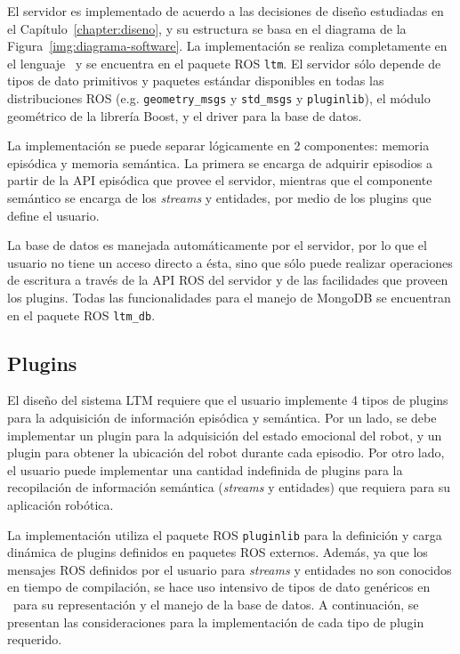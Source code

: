 El servidor es implementado de acuerdo a las decisiones de diseño estudiadas en el Capítulo~\ref{chapter:diseno}, y su estructura se basa en el diagrama de la Figura~\ref{img:diagrama-software}. La implementación se realiza completamente en el lenguaje \CC \ y se encuentra en el paquete ROS \texttt{ltm}. El servidor sólo depende de tipos de dato primitivos y paquetes estándar disponibles en todas las distribuciones ROS (e.g. \texttt{geometry\_msgs} y \texttt{std\_msgs} y \texttt{pluginlib}), el módulo geométrico de la librería Boost, y el driver para la base de datos. 

La implementación se puede separar lógicamente en 2 componentes: memoria episódica y memoria semántica. La primera se encarga de adquirir episodios a partir de la API episódica que provee el servidor, mientras que el componente semántico se encarga de los \textit{streams} y entidades, por medio de los plugins que define el usuario.

La base de datos es manejada automáticamente por el servidor, por lo que el usuario no tiene un acceso directo a ésta, sino que sólo puede realizar operaciones de escritura a través de la API ROS del servidor y de las facilidades que proveen los plugins. Todas las funcionalidades para el manejo de MongoDB se encuentran en el paquete ROS \texttt{ltm\_db}.


\subsection{Plugins}

El diseño del sistema LTM requiere que el usuario implemente 4 tipos de plugins para la adquisición de información episódica y semántica. Por un lado, se debe implementar un plugin para la adquisición del estado emocional del robot, y un plugin para obtener la ubicación del robot durante cada episodio. Por otro lado, el usuario puede implementar una cantidad indefinida de plugins para la recopilación de información semántica (\textit{streams} y entidades) que requiera para su aplicación robótica.

La implementación utiliza el paquete ROS \texttt{pluginlib} para la definición y carga dinámica de plugins definidos en paquetes ROS externos. Además, ya que los mensajes ROS definidos por el usuario para \textit{streams} y entidades no son conocidos en tiempo de compilación, se hace uso intensivo de tipos de dato genéricos en \CC \ para su representación y el manejo de la base de datos. A continuación, se presentan las consideraciones para la implementación de cada tipo de plugin requerido.


